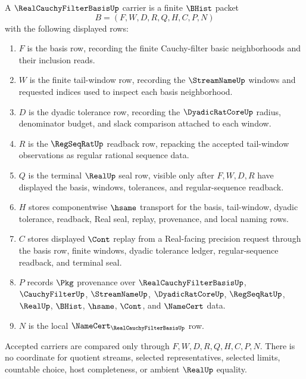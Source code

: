 \begin{definition}
\label{def:real-cauchy-filter-basis-carrier}
A $\RealCauchyFilterBasisUp$ carrier is a finite $\BHist$ packet
$$
B=(F,W,D,R,Q,H,C,P,N)
$$
with the following displayed rows:
\begin{enumerate}
\item $F$ is the basis row, recording the finite Cauchy-filter basic neighborhoods and their inclusion reads.
\item $W$ is the finite tail-window row, recording the $\StreamNameUp$ windows and requested indices used to inspect each basis neighborhood.
\item $D$ is the dyadic tolerance row, recording the $\DyadicRatCoreUp$ radius, denominator budget, and slack comparison attached to each window.
\item $R$ is the $\RegSeqRatUp$ readback row, repacking the accepted tail-window observations as regular rational sequence data.
\item $Q$ is the terminal $\RealUp$ seal row, visible only after $F,W,D,R$ have displayed the basis, windows, tolerances, and regular-sequence readback.
\item $H$ stores componentwise $\hsame$ transport for the basis, tail-window, dyadic tolerance, readback, Real seal, replay, provenance, and local naming rows.
\item $C$ stores displayed $\Cont$ replay from a Real-facing precision request through the basis row, finite windows, dyadic tolerance ledger, regular-sequence readback, and terminal seal.
\item $P$ records $\Pkg$ provenance over $\RealCauchyFilterBasisUp$, $\CauchyFilterUp$, $\StreamNameUp$, $\DyadicRatCoreUp$, $\RegSeqRatUp$, $\RealUp$, $\BHist$, $\hsame$, $\Cont$, and $\NameCert$ data.
\item $N$ is the local $\NameCert_{\RealCauchyFilterBasisUp}$ row.
\end{enumerate}
Accepted carriers are compared only through $F,W,D,R,Q,H,C,P,N$. There is no coordinate for quotient streams, selected representatives, selected limits, countable choice, host completeness, or ambient $\RealUp$ equality.
\end{definition}


